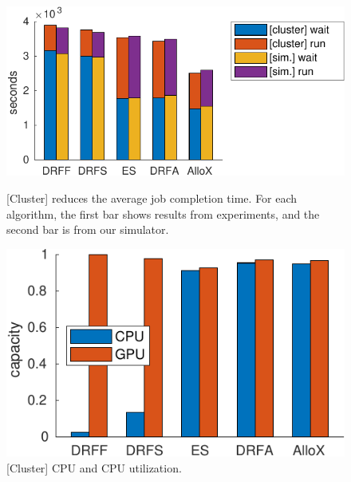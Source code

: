 \begin{figure}[t]
	\centering
{\includegraphics[width=1.0\linewidth]{figs/avg_comparison_group}}
	\caption{[Cluster] \name reduces the average job completion time. For each algorithm, the first bar shows results from experiments, and the second bar is from our simulator.} %
	\label{fig:avgCmplt_exp}
\end{figure}


\begin{figure}[b]
	\centering
	 \includegraphics[width=0.7\linewidth]{figs/res_util}  
	\caption{[Cluster] CPU and CPU utilization.}
	\label{fig:res_util}
\end{figure}

